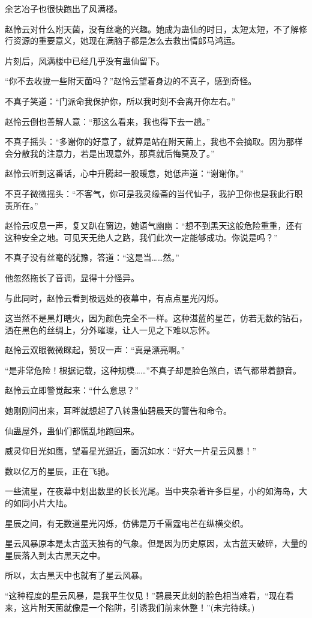 \begin{this_body}
余艺冶子也很快跑出了风满楼。

赵怜云对什么附天菌，没有丝毫的兴趣。她成为蛊仙的时日，太短太短，不了解修行资源的重要意义，她现在满脑子都是怎么去救出情郎马鸿运。

片刻后，风满楼中已经几乎没有蛊仙留下。

“你不去收拢一些附天菌吗？”赵怜云望着身边的不真子，感到奇怪。

不真子笑道：“门派命我保护你，所以我时刻不会离开你左右。”

赵怜云倒也善解人意：“那这么看来，我也得下去一趟。”

不真子摇头：“多谢你的好意了，就算是站在附天菌上，我也不会摘取。因为那样会分散我的注意力，若是出现意外，那真就后悔莫及了。”

赵怜云听到这番话，心中升腾起一股暖意，她低声道：“谢谢你。”

不真子微微摇头：“不客气，你可是我灵缘斋的当代仙子，我护卫你也是我此行职责所在。”

赵怜云叹息一声，复又趴在窗边，她语气幽幽：“想不到黑天这般危险重重，还有这种安全之地。可见天无绝人之路，我们此次一定能够成功。你说是吗？”

不真子没有丝毫的犹豫，答道：“这是当……然。”

他忽然拖长了音调，显得十分怪异。

与此同时，赵怜云看到极远处的夜幕中，有点点星光闪烁。

这当然不是黑灯瞎火，因为颜色完全不一样。这种湛蓝的星芒，仿若无数的钻石，洒在黑色的丝绸上，分外璀璨，让人一见之下难以忘怀。

赵怜云双眼微微眯起，赞叹一声：“真是漂亮啊。”

“是非常危险！根据记载，这种规模……”不真子却是脸色煞白，语气都带着颤音。

赵怜云立即警觉起来：“什么意思？”

她刚刚问出来，耳畔就想起了八转蛊仙碧晨天的警告和命令。

仙蛊屋外，蛊仙们都慌乱地跑回来。

威灵仰目光如鹰，望着星光逼近，面沉如水：“好大一片星云风暴！”

数以亿万的星辰，正在飞驰。

一些流星，在夜幕中划出数里的长长光尾。当中夹杂着许多巨星，小的如海岛，大的如同小片大陆。

星辰之间，有无数道星光闪烁，仿佛是万千雷霆电芒在纵横交织。

星云风暴原本是太古蓝天独有的气象。但是因为历史原因，太古蓝天破碎，大量的星辰落入到太古黑天之中。

所以，太古黑天中也就有了星云风暴。

“这种程度的星云风暴，是我平生仅见！”碧晨天此刻的脸色相当难看，“现在看来，这片附天菌就像是一个陷阱，引诱我们前来休整！”(未完待续。)

\end{this_body}


